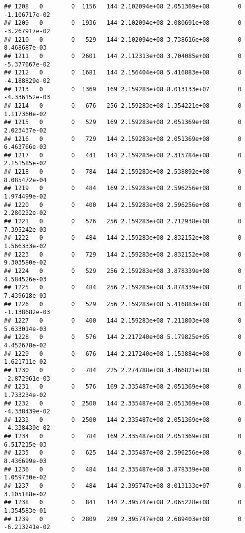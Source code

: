\documentclass[
]{article}
\begin{document}
\begin{enumerate}
\begin{verbatim}
## 1208   0        0  1156   144 2.102094e+08 2.051369e+08        0 -1.106717e-02
## 1209   0        0  1936   144 2.102094e+08 2.080691e+08        0 -3.267917e-02
## 1210   0        0   529   144 2.102094e+08 3.738616e+08        0  8.468687e-03
## 1211   0        0  2601   144 2.112313e+08 3.704085e+08        0 -5.377667e-02
## 1212   0        0  1681   144 2.156404e+08 5.416883e+08        0 -4.188829e-02
## 1213   0        0  1369   169 2.159283e+08 8.013133e+07        0 -4.336152e-03
## 1214   0        0   676   256 2.159283e+08 1.354221e+08        0  1.117360e-02
## 1215   0        0   529   169 2.159283e+08 2.051369e+08        0  2.023437e-02
## 1216   0        0   729   144 2.159283e+08 2.051369e+08        0  6.463766e-03
## 1217   0        0   441   144 2.159283e+08 2.315784e+08        0  2.151585e-02
## 1218   0        0   784   144 2.159283e+08 2.538892e+08        0  8.085472e-04
## 1219   0        0   484   169 2.159283e+08 2.596256e+08        0  1.974499e-02
## 1220   0        0   400   144 2.159283e+08 2.596256e+08        0  2.280232e-02
## 1221   0        0   576   256 2.159283e+08 2.712938e+08        0  7.395242e-03
## 1222   0        0   484   144 2.159283e+08 2.832152e+08        0  1.566333e-02
## 1223   0        0   729   144 2.159283e+08 2.832152e+08        0  9.303580e-02
## 1224   0        0   529   256 2.159283e+08 3.878339e+08        0  4.584526e-03
## 1225   0        0   484   256 2.159283e+08 3.878339e+08        0  7.439618e-03
## 1226   0        0   529   256 2.159283e+08 5.416883e+08        0 -1.138682e-03
## 1227   0        0   400   144 2.159283e+08 7.211803e+08        0  5.633014e-03
## 1228   0        0   576   144 2.217240e+08 5.179825e+05        0  4.452678e-02
## 1229   0        0   676   144 2.217240e+08 1.153884e+08        0  1.621711e-02
## 1230   0        0   784   225 2.274788e+08 3.466821e+08        0 -2.872961e-03
## 1231   0        0   576   169 2.335487e+08 2.051369e+08        0  1.733234e-02
## 1232   0        0  2500   144 2.335487e+08 2.051369e+08        0 -4.338439e-02
## 1233   0        0  2500   144 2.335487e+08 2.051369e+08        0 -4.338439e-02
## 1234   0        0   784   169 2.335487e+08 2.051369e+08        0  6.517215e-03
## 1235   0        0   625   144 2.335487e+08 2.596256e+08        0  8.436699e-03
## 1236   0        0   484   144 2.335487e+08 3.878339e+08        0  1.059730e-02
## 1237   0        0   484   144 2.395747e+08 8.013133e+07        0  3.105188e-02
## 1238   0        0   841   144 2.395747e+08 2.065228e+08        0  1.354583e-01
## 1239   0        0  2809   289 2.395747e+08 2.689403e+08        0 -6.213241e-02

\end{verbatim}
\end{enumerate}
\end{document}
